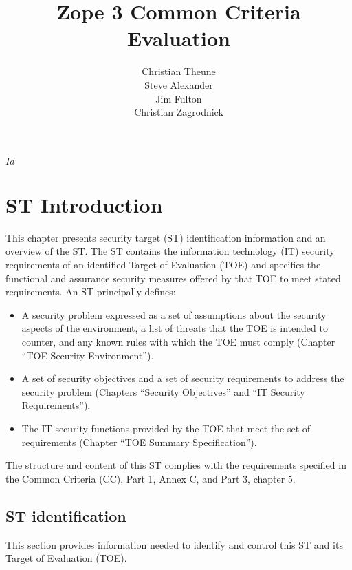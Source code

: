 \documentclass[12pt,english]{scrbook}
\title{Zope 3 Common Criteria Evaluation}
\author{Christian Theune \\
  Steve Alexander \\
  Jim Fulton \\
  Christian Zagrodnick}
\date{\svnInfoLongDate}
\begin{document}
\svnInfo $Id$

\maketitle
\tableofcontents
\newpage
\listoftables

\chapter{ST Introduction}

This chapter presents security target (ST) identification information and an
overview of the ST. The ST contains the information technology (IT) security
requirements of an identified Target of Evaluation (TOE) and specifies the
functional and assurance security measures offered by that TOE to meet stated
requirements. An ST principally defines:

\begin{itemize}
    \item A security problem expressed as a set of assumptions about the
    security aspects of the environment, a list of threats that the TOE is
    intended to counter, and any known rules with which the TOE must comply
    (Chapter ``TOE Security Environment'').

    \item A set of security objectives and a set of security requirements to
    address the security problem (Chapters ``Security Objectives'' and ``IT
    Security Requirements'').

    \item The IT security functions provided by the TOE that meet the set of
    requirements (Chapter ``TOE Summary Specification'').
\end{itemize}

The structure and content of this ST complies with the requirements specified
in the Common Criteria (CC), Part 1, Annex C, and Part 3, chapter 5.

\section{ST identification}

This section provides information needed to identify and control this ST and
its Target of Evaluation (TOE).
\end{document}
